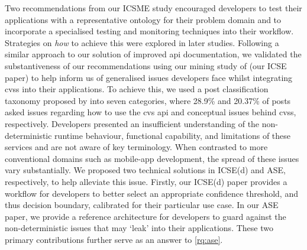 Two recommendations from our ICSME study encouraged developers to test their applications with a representative ontology for their problem domain and to incorporate a specialised testing and monitoring techniques into their workflow. Strategies on \textit{how} to achieve this were explored in later studies.  Following a similar approach to our solution of improved \gls{api} documentation, we validated the substantiveness of our recommendations using our mining study of  (our ICSE paper) to help inform us of generalised issues developers face whilst integrating \glspl{cvs} into their applications. To achieve this, we used a  post classification taxonomy proposed by \citet{Beyer:2018fm} into seven categories, where 28.9\% and 20.37\% of posts asked issues regarding how to use the \gls{cvs} \gls{api} and conceptual issues behind \glspl{cvs}, respectively. Developers presented an insufficient understanding of the non-deterministic runtime behaviour, functional capability, and limitations of these services and are not aware of key  terminology. When contrasted to more conventional domains such as mobile-app development, the spread of these issues vary substantially. We proposed two technical solutions in ICSE(d) and ASE, respectively, to help alleviate this issue.  Firstly, our ICSE(d) paper provides a workflow for developers to better select an appropriate confidence threshold, and thus decision boundary, calibrated for their particular use case. In our ASE paper, we provide a reference architecture for developers to guard against the non-deterministic issues that may `leak' into their applications. These two primary contributions further serve as an answer to \ref{rq:ase}.

